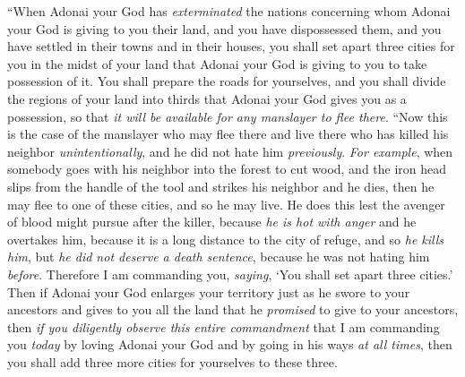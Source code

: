 \begin{biblechapter} %
\verse “When Adonai your God has \textit{exterminated} the nations concerning whom Adonai your God is giving to you their land, and you have dispossessed them, and you have settled in their towns and in their houses,
\verse you shall set apart three cities for you in the midst of your land that Adonai your God is giving to you to take possession of it.
\verse You shall prepare the roads for yourselves, and you shall divide the regions of your land into thirds that Adonai your God gives you as a possession, so that \textit{it will be available for any manslayer to flee there}.
\verse “Now this is the case of the manslayer who may flee there and live there who has killed his neighbor \textit{unintentionally}, and he did not hate him \textit{previously}.
\verse \textit{For example}, when somebody goes with his neighbor into the forest to cut wood, and the iron head slips from the handle of the tool and strikes his neighbor and he dies, then he may flee to one of these cities, and so he may live.
\verse He does this lest the avenger of blood might pursue after the killer, because \textit{he is hot with anger} and he overtakes him, because it is a long distance to the city of refuge, and so \textit{he kills him}, but \textit{he did not deserve a death sentence}, because he was not hating him \textit{before}.
\verse Therefore I am commanding you, \textit{saying}, ‘You shall set apart three cities.’
\verse Then if Adonai your God enlarges your territory just as he swore to your ancestors and gives to you all the land that he \textit{promised} to give to your ancestors,
\verse then \textit{if you diligently observe this entire commandment} that I am commanding you \textit{today} by loving Adonai your God and by going in his ways \textit{at all times}, then you shall add three more cities for yourselves to these three.

\end{biblechapter}
